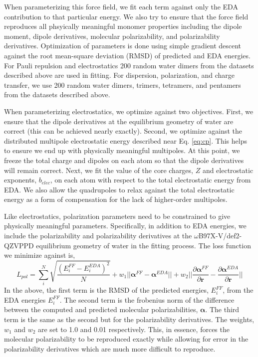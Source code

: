 \documentclass[journal=jacsat,manuscript=article]{achemso}
\begin{document}
When parameterizing this force field, we fit each term against only the EDA contribution
to that particular energy. We also try to ensure that the force field reproduces
all phsyically meaningful monomer properties including the dipole moment, dipole derivatives,
molecular polarizability, and polarizability derivatives. Optimization of parameters is done using simple gradient descent
against the root mean-square deviation (RMSD) of predicted and EDA energies.
For Pauli repulsion and electrostatics 200 random water dimers from the datasets
described above are used in fitting. For dispersion, polarization, and charge transfer, we use
200 random water dimers, trimers, tetramers, and pentamers from the datasets described above.

When parameterizing electrostatics, we optimize against two objectives. First, we ensure
that the dipole derivatives at the equilibrium geometry of water are correct (this can be achieved
nearly exactly). Second, we optimize against the distributed multipole electrostatic energy described
near Eq. \ref{eq:cp}. This helps to ensure we end up with physically meaningful multipoles.
At this point, we freeze the total charge and dipoles on each atom so that the dipole derivatives
will remain correct. Next, we fit the value of the core charges, $Z$ and electrostatic exponents, $b_{elec}$, on each atom
with respect to the total electrostatic energy from EDA. We also allow the quadrupoles to relax
against the total electrostatic energy as a form of compensation for the lack of higher-order multipoles.

Like electrostatics, polarization parameters need to be constrained to give physically meaningful
parameters. Specifically, in addition to EDA energies, we include the polarizability and polarizability derivatives
at the $\omega$B97X-V/def2-QZVPPD equilibrium geometry of water in the fitting process.
The loss function we minimize against is,
\begin{equation}
  L_{pol}=\sum_{i}^{N} \sqrt{\frac{(E_i^{FF}-E_i^{EDA})^2}{N}} + w_1||\bm{\alpha}^{FF}-\bm{\alpha}^{EDA}||+w_2||\frac{\partial\bm{\alpha}^{FF}}{\partial \bm{r}}-\frac{\partial\bm{\alpha}^{EDA}}{\partial \bm{r}}||
\label{eq:pol_loss}
\end{equation}
\noindent
In the above, the first term is the RMSD of the predicted energies, $E_i^{FF}$, from the
EDA energies $E_i^{FF}$. The second term is the frobenius norm of the difference between the
computed and predicted molecular polarizabilities, $\bm{\alpha}$. The third term is the same as
the second but for the polarizability derivatives. The weights, $w_1$ and $w_2$ are set to
1.0 and 0.01 respectively. This, in essence, forces the molecular polarizability to be
reproduced exactly while allowing for error in the polarizability derivatives which are much
more difficult to reproduce.
\end{document}
